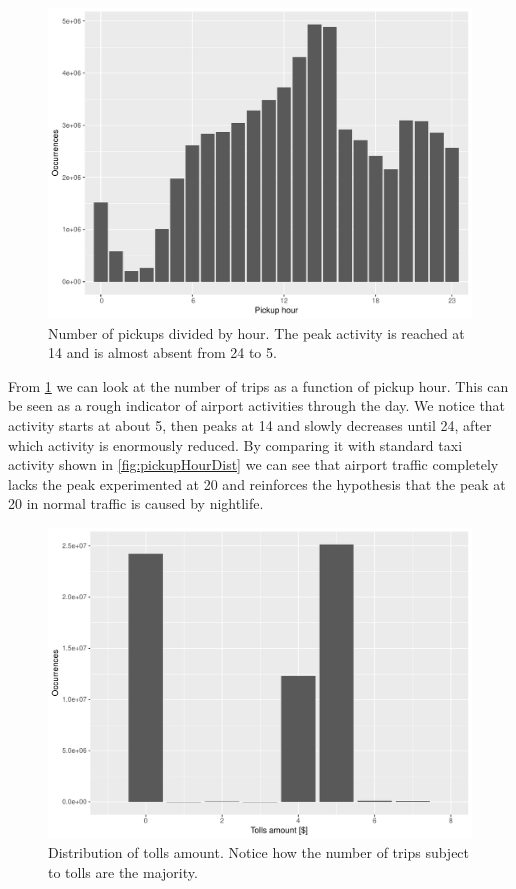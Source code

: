 \documentclass{acm_proc_article-sp-sigmod09}
\begin{document}
\begin{figure}
	\centering
	\includegraphics[width=1\columnwidth]{resources/airport/pickup_hour_dist.pdf}
	\caption{Number of pickups divided by hour. The peak activity is reached at 14 and is almost absent from 24 to 5.}
	\label{fig:airportPickupHourDistr}
\end{figure}


From \cref{fig:airportPickupHourDistr} we can look at the number of trips as a function of pickup hour. This can be seen as a rough indicator of airport activities through the day. We notice that activity starts at about 5, then peaks at 14 and slowly decreases until 24, after which activity is enormously reduced. By comparing it with standard taxi activity shown in \cref{fig:pickupHourDist} we can see that airport traffic completely lacks the peak experimented at 20 and reinforces the hypothesis that the peak at 20 in normal traffic is caused by nightlife.

\begin{figure}
	\centering
	\includegraphics[width=1\columnwidth]{resources/airport/tolls_amount_distr.pdf}
	\caption{Distribution of tolls amount. Notice how the number of trips subject to tolls are the majority.}
	\label{fig:airportTollsAmount}
\end{figure}
\end{document}
